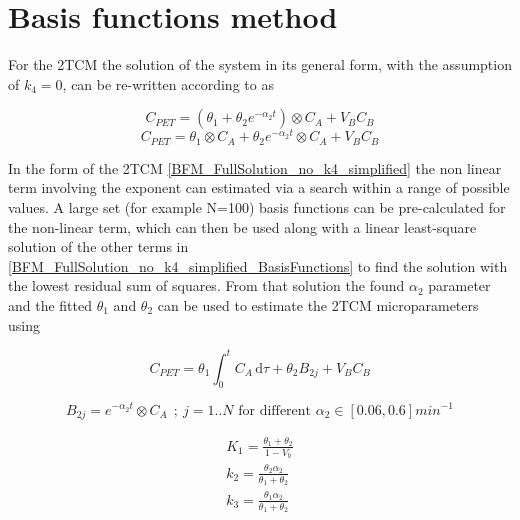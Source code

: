 \section{Basis functions method}
For the 2TCM the solution of the system in its general form, with the assumption of $k_4 = 0$, can be re-written according to \cite{Hong2010} as 

\begin{equation} \label{BFM_FullSolution_no_k4}
C_{PET} = (\theta_1 + \theta_2 e^{-\alpha_2 t } ) \otimes C_A + V_B C_B
\end{equation}
\begin{equation} \label{BFM_FullSolution_no_k4_simplified}
C_{PET} = \theta_1 \otimes C_A + \theta_2 e^{-\alpha_2 t } \otimes C_A   + V_B C_B
\end{equation}

In the form of the 2TCM \ref{BFM_FullSolution_no_k4_simplified} the non linear term involving the exponent can estimated via a search within a range of possible values. A large set (for example N=100) basis functions can be pre-calculated for the non-linear term, which can then be used along with a linear least-square solution of the other terms in \ref{BFM_FullSolution_no_k4_simplified_BasisFunctions} to find the solution with the lowest residual sum of squares. From that solution the found $\alpha_2$ parameter and the fitted $\theta_1$ and $\theta_2$ can be used to estimate the 2TCM microparameters using

\begin{equation} \label{BFM_FullSolution_no_k4_simplified_BasisFunctions}
C_{PET} = \theta_1 \int_0^t \! C_A \, \mathrm{d}\tau + \theta_2 B_{2j}   + V_B C_B
\end{equation}

\begin{equation} \label{BasisFunctions}
B_{2j} = e^{-\alpha_2 t } \otimes C_A   \ \ ; \  j=1..N \textrm{ for different } \alpha_2 \in [0.06,0.6]min^{-1}
\end{equation}


\begin{subequations}
\begin{align}
K_1 = \frac{\theta_1 + \theta_2}{1-V_b} \\
k_2 = \frac{\theta_2\alpha_2}{\theta_1 + \theta_2} \\
k_3 = \frac{\theta_1\alpha_2}{\theta_1 + \theta_2}
\end{align}
\label{eqn:FDG_microparameters}
\end{subequations}

